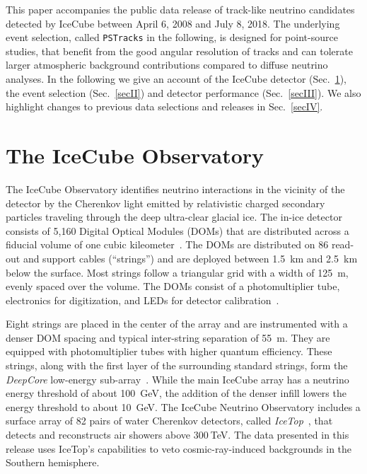 \documentclass[aps,10pt,prd,twocolumn,floats,letterpaper,showpacs,nofootinbib,bibnotes,notitlepage,superscriptaddress,floatfix]{revtex4-1}
\begin{document}
This paper accompanies the public data release of track-like neutrino candidates detected by IceCube between April 6, 2008 and July 8, 2018. The underlying event selection, called {\tt PSTracks} in the following, is designed for point-source studies, that benefit from the good angular resolution of tracks and can tolerate larger atmospheric background contributions compared to diffuse neutrino analyses. In the following we give an account of the IceCube detector (Sec.~\ref{secI}), the event selection (Sec.~\ref{secII}) and detector performance (Sec.~\ref{secIII}). We also highlight changes to previous data selections and releases in Sec.~\ref{secIV}.

\section{The IceCube Observatory}\label{secI}

The IceCube Observatory identifies neutrino interactions in the vicinity of the detector by the Cherenkov light emitted by relativistic charged secondary particles traveling through the deep ultra-clear glacial ice. The in-ice detector consists of 5,160 Digital Optical Modules (DOMs) that are distributed across a fiducial volume of one cubic kileometer~\cite{Abbasi:2008aa, Abbasi:2010vc}. The DOMs are distributed on 86 read-out and support cables (``strings'') and are deployed between 1.5~km and 2.5~km below the surface. Most strings follow a triangular grid with a width of 125~m, evenly spaced over the volume. The DOMs consist of a photomultiplier tube, electronics for digitization, and LEDs for detector calibration~\cite{Abbasi:2008aa, Abbasi:2010vc}.

Eight strings are placed in the center of the array and are instrumented with a denser DOM spacing and typical inter-string separation of 55~m. They are equipped with photomultiplier tubes with higher quantum efficiency. These strings, along with the first layer of the surrounding standard strings, form the \emph{DeepCore} low-energy sub-array~\cite{Collaboration:2011ym}. While the main IceCube array has a neutrino energy threshold of about 100~GeV, the addition of the denser infill lowers the energy threshold to about 10~GeV. The IceCube Neutrino Observatory includes a surface array of 82 pairs of water Cherenkov detectors, called \emph{IceTop}~\cite{IceCube:2012nn}, that detects and reconstructs air showers above $300\:$TeV. The data presented in this release uses IceTop's capabilities to veto cosmic-ray-induced backgrounds in the Southern hemisphere.
\end{document}
